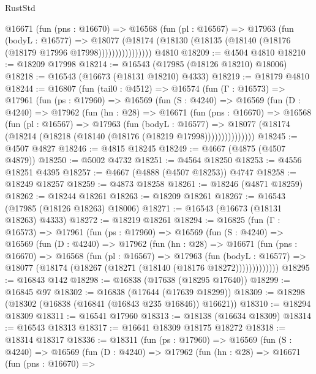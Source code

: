 \begin{lexlean}{RustStd}
\begin{coremodule}
                @16671
                  (fun (pns : @16670) =>
                  @16568
                    (fun (pl : @16567) =>
                    @17963
                      (fun (bodyL : @16577) =>
                      @18077
                        (@18174
                          (@18130 (@18135 (@18140 (@18176 (@18179 @17996 @17998))))))))))))))))
    @4810
@18209 := @4504 @4810
@18210 := @18209 @17998
@18214 := @16543 (@17985 (@18126 @18210) @18006)
@18218 := @16543 (@16673 (@18131 @18210) @4333)
@18219 := @18179 @4810
@18244 := @16807
    (fun (tail0 : @4512) =>
    @16574
      (fun (Γ : @16573) =>
      @17961
        (fun (ps : @17960) =>
        @16569
          (fun (S : @4240) =>
          @16569
            (fun (D : @4240) =>
            @17962
              (fun (hn : @28) =>
              @16671
                (fun (pns : @16670) =>
                @16568
                  (fun (pl : @16567) =>
                  @17963
                    (fun (bodyL : @16577) =>
                    @18077 (@18174 (@18214 (@18218 (@18140 (@18176 (@18219 @17998)))))))))))))))
@18245 := @4507 @4827
@18246 := @4815 @18245
@18249 := @4667 (@4875 (@4507 @4879))
@18250 := @5002 @4732
@18251 := @4564 @18250
@18253 := @4556 @18251 @4395
@18257 := @4667 (@4888 (@4507 @18253)) @4747
@18258 := @18249 @18257
@18259 := @4873 @18258
@18261 := @18246 (@4871 @18259)
@18262 := @18244 @18261
@18263 := @18209 @18261
@18267 := @16543 (@17985 (@18126 @18263) @18006)
@18271 := @16543 (@16673 (@18131 @18263) @4333)
@18272 := @18219 @18261
@18294 := @16825
    (fun (Γ : @16573) =>
    @17961
      (fun (ps : @17960) =>
      @16569
        (fun (S : @4240) =>
        @16569
          (fun (D : @4240) =>
          @17962
            (fun (hn : @28) =>
            @16671
              (fun (pns : @16670) =>
              @16568
                (fun (pl : @16567) =>
                @17963
                  (fun (bodyL : @16577) =>
                  @18077 (@18174 (@18267 (@18271 (@18140 (@18176 @18272)))))))))))))
@18295 := @16843 @142
@18298 := @16838 (@17638 (@18295 @17640))
@18299 := @16845 @97
@18302 := @16838 (@17644 (@17639 @18299))
@18309 := @18298 (@18302 (@16838 (@16841 (@16843 @235 @16846)) @16621))
@18310 := @18294 @18309
@18311 := @16541 @17960
@18313 := @18138 (@16634 @18309)
@18314 := @16543 @18313
@18317 := @16641 @18309 @18175 @18272
@18318 := @18314 @18317
@18336 := @18311
    (fun (ps : @17960) =>
    @16569
      (fun (S : @4240) =>
      @16569
        (fun (D : @4240) =>
        @17962
          (fun (hn : @28) =>
          @16671
            (fun (pns : @16670) =>

\end{coremodule}
\end{lexlean}
